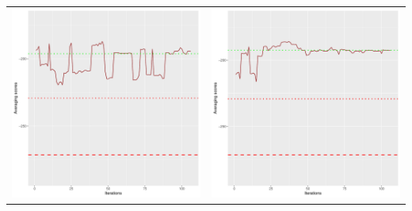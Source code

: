 \documentclass[]{scrartcl}
\begin{document}
\begin{table}[h!]
\begin{tabular}{cc}
\includegraphics[scale = 0.4]{./figs/asia/v5/10/avgBoundsEvolution-107.pdf} & 
\includegraphics[scale = 0.4]{./figs/asia/v5/20/avgBoundsEvolution-107.pdf} \\

\end{tabular}
\end{table}
\end{document}
